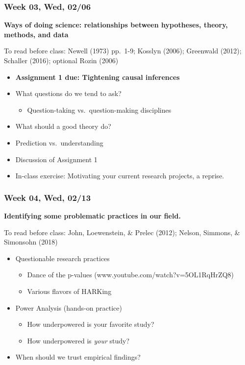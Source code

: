 \documentclass[11pt,man]{article}
\providecommand{\tightlist}{%
  \setlength{\itemsep}{0pt}\setlength{\parskip}{0pt}}
\begin{document}
\subsubsection{Week 03, Wed, 02/06}\label{week-03-wed-0206}

\textbf{Ways of doing science: relationships between hypotheses, theory,
methods, and data}

To read before class: Newell (1973) pp.~1-9; Kosslyn (2006); Greenwald
(2012); Schaller (2016); optional Rozin (2006)

\begin{itemize}
\tightlist
\item
  \textbf{Assignment 1 due: Tightening causal inferences}
\item
  What questions do we tend to ask?

  \begin{itemize}
  \tightlist
  \item
    Question-taking vs.~question-making disciplines
  \end{itemize}
\item
  What should a good theory do?
\item
  Prediction vs.~understanding
\item
  Discussion of Assignment 1
\item
  In-class exercise: Motivating your current research projects, a
  reprise.
\end{itemize}

\subsubsection{Week 04, Wed, 02/13}\label{week-04-wed-0213}

\textbf{Identifying some problematic practices in our field.}

To read before class: John, Loewenstein, \& Prelec (2012); Nelson,
Simmons, \& Simonsohn (2018)

\begin{itemize}
\tightlist
\item
  Questionable research practices

  \begin{itemize}
  \tightlist
  \item
    Dance of the p-values (www.youtube.com/watch?v=5OL1RqHrZQ8)
  \item
    Various flavors of HARKing
  \end{itemize}
\item
  Power Analysis (hands-on practice)

  \begin{itemize}
  \tightlist
  \item
    How underpowered is your favorite study?
  \item
    How underpowered is \emph{your} study?
  \end{itemize}
\item
  When should we trust empirical findings?
\end{itemize}
\end{document}
